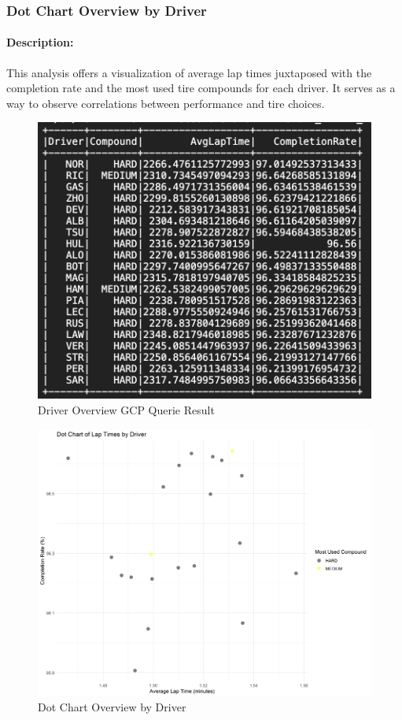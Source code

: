 \documentclass{article}
\begin{document}
\subsubsection{Dot Chart Overview by Driver}
\paragraph{Description:}
This analysis offers a visualization of average lap times juxtaposed with the completion rate and the most used tire compounds for each driver. It serves as a way to observe correlations between performance and tire choices.

\begin{figure}[H]
    \centering
    \includegraphics[width=\textwidth]{ovw.png}
    \caption{Driver Overview GCP Querie Result }
\end{figure}

\begin{figure}[H]
    \centering
    \includegraphics[width=\textwidth]{LapTimesDotChart.png}
    \caption{Dot Chart Overview by Driver}
\end{figure}
\end{document}
